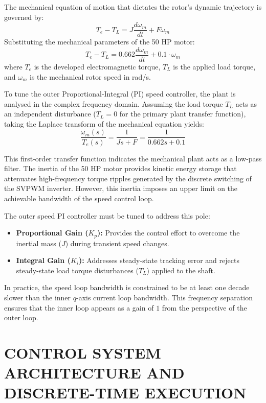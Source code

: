 \documentclass[12pt,a4paper]{report}
\begin{document}
The mechanical equation of motion that dictates the rotor's dynamic trajectory is governed by:
\begin{equation}
T_e - T_L = J \frac{d\omega_m}{dt} + F\omega_m
\end{equation}
Substituting the mechanical parameters of the 50 HP motor:
\begin{equation}
T_e - T_L = 0.662 \frac{d\omega_m}{dt} + 0.1 \cdot \omega_m
\end{equation}
where $T_e$ is the developed electromagnetic torque, $T_L$ is the applied load torque, and $\omega_m$ is the mechanical rotor speed in rad/s.

To tune the outer Proportional-Integral (PI) speed controller, the plant is analysed in the complex frequency domain. Assuming the load torque $T_L$ acts as an independent disturbance ($T_L = 0$ for the primary plant transfer function), taking the Laplace transform of the mechanical equation yields:
\begin{equation}
\frac{\omega_m(s)}{T_e(s)} = \frac{1}{Js + F} = \frac{1}{0.662s + 0.1}
\end{equation}

This first-order transfer function indicates the mechanical plant acts as a low-pass filter. The inertia of the 50 HP motor provides kinetic energy storage that attenuates high-frequency torque ripples generated by the discrete switching of the SVPWM inverter. However, this inertia imposes an upper limit on the achievable bandwidth of the speed control loop.

The outer speed PI controller must be tuned to address this pole:
\begin{itemize}
    \item \textbf{Proportional Gain ($K_p$):} Provides the control effort to overcome the inertial mass ($J$) during transient speed changes.
    \item \textbf{Integral Gain ($K_i$):} Addresses steady-state tracking error and rejects steady-state load torque disturbances ($T_L$) applied to the shaft.
\end{itemize}

In practice, the speed loop bandwidth is constrained to be at least one decade slower than the inner $q$-axis current loop bandwidth. This frequency separation ensures that the inner loop appears as a gain of $1$ from the perspective of the outer loop.

\chapter{CONTROL SYSTEM ARCHITECTURE AND DISCRETE-TIME EXECUTION}
\end{document}
